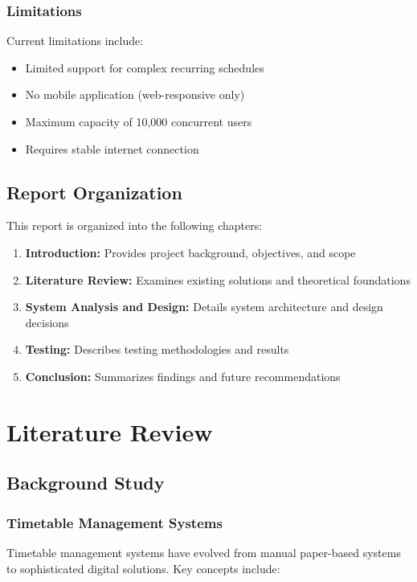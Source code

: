 \documentclass[12pt,a4paper]{report}
\begin{document}
\subsection{Limitations}
Current limitations include:
\begin{itemize}
    \item Limited support for complex recurring schedules
    \item No mobile application (web-responsive only)
    \item Maximum capacity of 10,000 concurrent users
    \item Requires stable internet connection
\end{itemize}

\section{Report Organization}
This report is organized into the following chapters:

\begin{enumerate}
    \item \textbf{Introduction:} Provides project background, objectives, and scope
    \item \textbf{Literature Review:} Examines existing solutions and theoretical foundations
    \item \textbf{System Analysis and Design:} Details system architecture and design decisions
    \item \textbf{Testing:} Describes testing methodologies and results
    \item \textbf{Conclusion:} Summarizes findings and future recommendations
\end{enumerate}

\chapter{Literature Review}
\section{Background Study}
\subsection{Timetable Management Systems}
Timetable management systems have evolved from manual paper-based systems to sophisticated digital solutions. Key concepts include:
\end{document}
